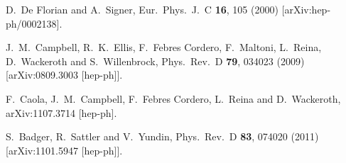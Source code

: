 \documentclass[12pt]{article}
\begin{document}
\begin{thebibliography}{99}
  D.~De Florian and A.~Signer,
  Eur.\ Phys.\ J.\  C {\bf 16}, 105 (2000)
  [arXiv:hep-ph/0002138].

  J.~M.~Campbell, R.~K.~Ellis, F.~Febres Cordero, F.~Maltoni, L.~Reina, D.~Wackeroth and S.~Willenbrock,
  Phys.\ Rev.\  D {\bf 79}, 034023 (2009)
  [arXiv:0809.3003 [hep-ph]].
  
  F.~Caola, J.~M.~Campbell, F.~Febres Cordero, L.~Reina and D.~Wackeroth,
  arXiv:1107.3714 [hep-ph].

  S.~Badger, R.~Sattler and V.~Yundin,
  Phys.\ Rev.\  D {\bf 83}, 074020 (2011)
  [arXiv:1101.5947 [hep-ph]].

\end{thebibliography}
\end{document}
